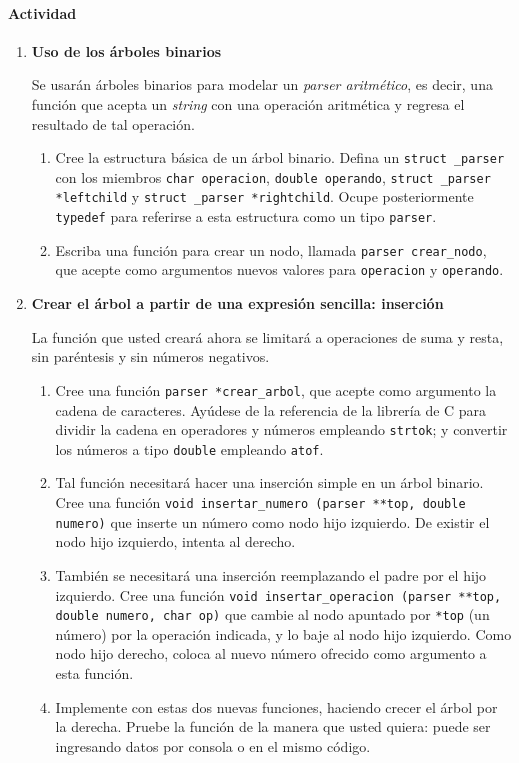 \documentclass[a4paper,10pt]{article}
\begin{document}
\paragraph{Actividad}
\begin{enumerate}
 \item \textbf{Uso de los árboles binarios}

  Se usarán árboles binarios para modelar un \textit{parser aritmético}, es decir, una función que acepta un \textit{string} con una operación aritmética
  y regresa el resultado de tal operación.
  \begin{enumerate}
    \item Cree la estructura básica de un árbol binario. Defina un \texttt{struct \_parser} con los miembros \texttt{char operacion}, \texttt{double operando},
    \texttt{struct \_parser *leftchild} y \texttt{struct \_parser *rightchild}. Ocupe posteriormente \texttt{typedef} para referirse a esta estructura como
    un tipo \texttt{parser}.
    \item Escriba una función para crear un nodo, llamada \texttt{parser crear\_nodo}, que acepte como argumentos nuevos valores para \texttt{operacion} y
	  \texttt{operando}.
  \end{enumerate}

  \item \textbf{Crear el árbol a partir de una expresión sencilla: inserción}

  La función que usted creará ahora se limitará a operaciones de suma y resta, sin paréntesis y sin números negativos.

  \begin{enumerate}
    \item Cree una función \texttt{parser *crear\_arbol}, que acepte como argumento la cadena de caracteres. Ayúdese de la referencia de la librería de C para
	  dividir la cadena en operadores y números empleando \texttt{strtok}; y convertir los números a tipo \texttt{double} empleando \texttt{atof}.
    \item Tal función necesitará hacer una inserción simple en un árbol binario. Cree una función \texttt{void insertar\_numero (parser **top, double numero)} que inserte
	  un número como nodo hijo izquierdo. De existir el nodo hijo izquierdo, intenta al derecho.
    \item También se necesitará una inserción reemplazando el padre por el hijo izquierdo. Cree una función \texttt{void insertar\_operacion (parser **top, double numero, char op)}
	  que cambie al nodo apuntado por \texttt{*top} (un número) por la operación indicada, y lo baje al nodo hijo izquierdo. Como nodo hijo derecho, coloca
	  al nuevo número ofrecido como argumento a esta función.
    \item Implemente con estas dos nuevas funciones, haciendo crecer el árbol por la derecha. Pruebe la función de la manera que usted quiera: puede ser ingresando
	  datos por consola o en el mismo código.
  \end{enumerate}



\end{enumerate}
\end{document}
